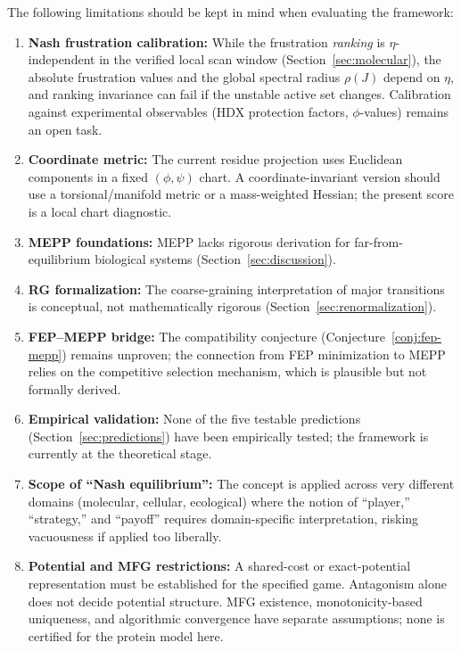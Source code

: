 \documentclass[12pt,a4paper]{article}
\theoremstyle{remark}
\begin{document}
The following limitations should be kept in mind when evaluating the framework:
\begin{enumerate}
    \item \textbf{Nash frustration calibration:} While the frustration \emph{ranking} is $\eta$-independent in the verified local scan window (Section~\ref{sec:molecular}), the absolute frustration values and the global spectral radius $\rho(J)$ depend on $\eta$, and ranking invariance can fail if the unstable active set changes. Calibration against experimental observables (HDX protection factors, $\phi$-values) remains an open task.
    \item \textbf{Coordinate metric:} The current residue projection uses Euclidean components in a fixed $(\phi,\psi)$ chart. A coordinate-invariant version should use a torsional/manifold metric or a mass-weighted Hessian; the present score is a local chart diagnostic.
    \item \textbf{MEPP foundations:} MEPP lacks rigorous derivation for far-from-equilibrium biological systems (Section~\ref{sec:discussion}).
    \item \textbf{RG formalization:} The coarse-graining interpretation of major transitions is conceptual, not mathematically rigorous (Section~\ref{sec:renormalization}).
    \item \textbf{FEP--MEPP bridge:} The compatibility conjecture (Conjecture~\ref{conj:fep-mepp}) remains unproven; the connection from FEP minimization to MEPP relies on the competitive selection mechanism, which is plausible but not formally derived.
    \item \textbf{Empirical validation:} None of the five testable predictions (Section~\ref{sec:predictions}) have been empirically tested; the framework is currently at the theoretical stage.
    \item \textbf{Scope of ``Nash equilibrium'':} The concept is applied across very different domains (molecular, cellular, ecological) where the notion of ``player,'' ``strategy,'' and ``payoff'' requires domain-specific interpretation, risking vacuousness if applied too liberally.
    \item \textbf{Potential and MFG restrictions:} A shared-cost or exact-potential representation must be established for the specified game. Antagonism alone does not decide potential structure. MFG existence, monotonicity-based uniqueness, and algorithmic convergence have separate assumptions; none is certified for the protein model here.
\end{enumerate}
\end{document}
